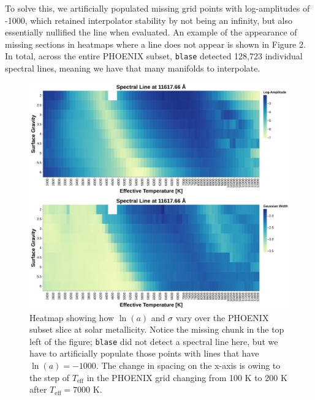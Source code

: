 \documentclass[twocolumn]{aastex631}
\begin{document}
To solve this, we artificially
populated missing grid points with log-amplitudes of -1000, which retained
interpolator stability by not being an infinity, but also essentially 
nullified the line when evaluated. An example of the appearance of missing 
sections in heatmaps where a line does not appear is shown in Figure 2. 
In total, across the entire PHOENIX subset, \texttt{blase} detected 
128,723 individual spectral lines, meaning we have that many manifolds to 
interpolate.

\begin{figure}[t!]
    \centering
    \includegraphics[width=\textwidth]{images/figure2.png}
    \caption{Heatmap showing how $\ln(a)$ and $\sigma$ vary over the PHOENIX subset
    slice at solar metallicity. Notice the missing chunk in the top left
    of the figure; \texttt{blase} did not detect a spectral line here,
    but we have to artificially populate those points with lines that 
    have $\ln(a) = -1000$. The change in spacing on the x-axis is owing to
    the step of $T_\mathrm{eff}$ in the PHOENIX grid changing from 100 K to 
    200 K after $T_\mathrm{eff} = 7000$ K.}
\end{figure}
\end{document}

